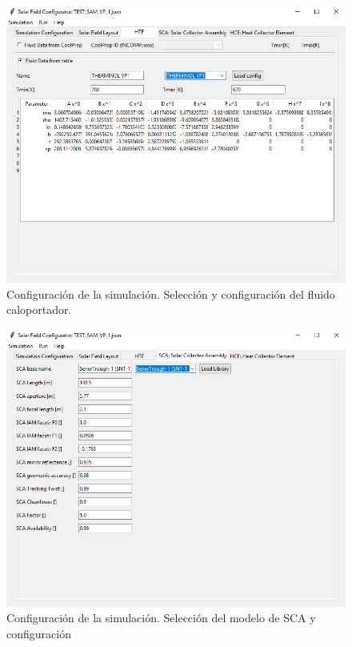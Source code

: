 \documentclass[11pt]{article}
\begin{document}
\begin{figure}
\includegraphics[scale=0.8]{images/interface03.png}
\caption{Configuración de la simulación. Selección y configuración del fluido caloportador.} 
\label{fig:interface03}
\end{figure}

\begin{figure}
\includegraphics[scale=0.8]{images/interface04.png}
\caption{Configuración de la simulación. Selección del modelo de SCA y configuración} 
\label{fig:interface04}
\end{figure}
\end{document}
